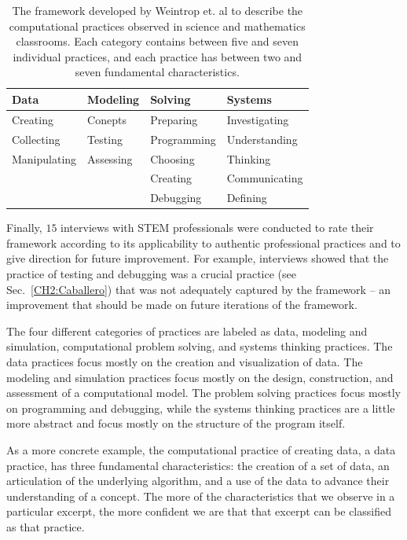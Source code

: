 \documentclass{msuphddissertation}
\begin{document}
\begin{doublespace}
\begin{table}[hb]\centering
\begin{tabular}{llll}\hline\hline
Data         & Modeling     & Solving     & Systems       \\\hline
Creating     & Conepts      & Preparing   & Investigating \\
Collecting   & Testing      & Programming & Understanding \\
Manipulating & Assessing    & Choosing    & Thinking      \\
             &              & Creating    & Communicating \\
             &              & Debugging   & Defining      \\\hline\hline
\end{tabular}
\caption{The framework developed by Weintrop et. al to describe the computational practices observed in science and mathematics classrooms.  Each category contains between five and seven individual practices, and each practice has between two and seven fundamental characteristics.}\label{CH2:Framework}
\end{table}

Finally, $15$ interviews with STEM professionals were conducted to rate their framework according to its applicability to authentic professional practices and to give direction for future improvement.  For example, interviews showed that the practice of testing and debugging was a crucial practice (see Sec.~\ref{CH2:Caballero}) that was not adequately captured by the framework -- an improvement that should be made on future iterations of the framework.

The four different categories of practices are labeled as data, modeling and simulation, computational problem solving, and systems thinking practices.  The data practices focus mostly on the creation and visualization of data.  The modeling and simulation practices focus mostly on the design, construction, and assessment of a computational model.  The problem solving practices focus mostly on programming and debugging, while the systems thinking practices are a little more abstract and focus mostly on the structure of the program itself.

As a more concrete example, the computational practice of creating data, a data practice, has three fundamental characteristics: the creation of a set of data, an articulation of the underlying algorithm, and a use of the data to advance their understanding of a concept.  The more of the characteristics that we observe in a particular excerpt, the more confident we are that that excerpt can be classified as that practice.


\end{doublespace}
\end{document}
